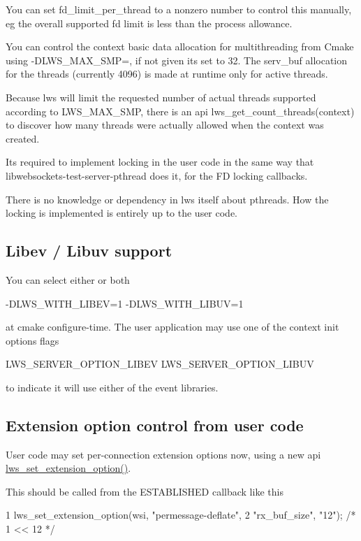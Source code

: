 You can set fd\+\_\+limit\+\_\+per\+\_\+thread to a nonzero number to control this manually, eg the overall supported fd limit is less than the process allowance.

You can control the context basic data allocation for multithreading from Cmake using -\/\+D\+L\+W\+S\+\_\+\+M\+A\+X\+\_\+\+S\+MP=, if not given it\textquotesingle{}s set to 32. The serv\+\_\+buf allocation for the threads (currently 4096) is made at runtime only for active threads.

Because lws will limit the requested number of actual threads supported according to L\+W\+S\+\_\+\+M\+A\+X\+\_\+\+S\+MP, there is an api lws\+\_\+get\+\_\+count\+\_\+threads(context) to discover how many threads were actually allowed when the context was created.

It\textquotesingle{}s required to implement locking in the user code in the same way that libwebsockets-\/test-\/server-\/pthread does it, for the FD locking callbacks.

There is no knowledge or dependency in lws itself about pthreads. How the locking is implemented is entirely up to the user code.

\subsection*{Libev / Libuv support }

You can select either or both \begin{DoxyVerb}    -DLWS_WITH_LIBEV=1
    -DLWS_WITH_LIBUV=1
\end{DoxyVerb}


at cmake configure-\/time. The user application may use one of the context init options flags \begin{DoxyVerb}    LWS_SERVER_OPTION_LIBEV
    LWS_SERVER_OPTION_LIBUV
\end{DoxyVerb}


to indicate it will use either of the event libraries.

\subsection*{Extension option control from user code }

User code may set per-\/connection extension options now, using a new api {\ttfamily \hyperlink{group__extensions_gae0e24e1768f83a7fb07896ce975704b9}{lws\+\_\+set\+\_\+extension\+\_\+option()}}.

This should be called from the E\+S\+T\+A\+B\+L\+I\+S\+H\+ED callback like this 
\begin{DoxyCode}
1 lws\_set\_extension\_option(wsi, "permessage-deflate",
2                          "rx\_buf\_size", "12"); /* 1 << 12 */
\end{DoxyCode}


